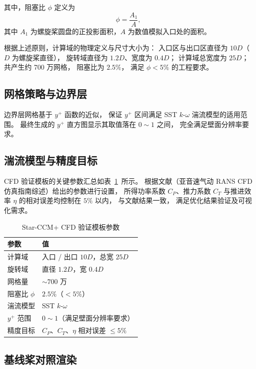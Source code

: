 其中，阻塞比 $\phi$ 定义为
\begin{equation}
\phi = \frac{A_1}{A},
\end{equation}
其中 $A_1$ 为螺旋桨圆盘的正投影面积，$A$ 为数值模拟入口处的面积。

根据上述原则，计算域的物理定义与尺寸大小为：
入口区与出口区直径为 $10D$（$D$ 为螺旋桨直径），
旋转域直径为 $1.2D$、宽度为 $0.4D$；
计算域总宽度为 $25D$；
共产生约 700 万网格，
阻塞比为 $2.5\%$，
满足 $\phi < 5\%$ 的工程要求。

\subsection{网格策略与边界层}

边界层网格基于 $y^+$ 函数的近似，
保证 $y^+$ 区间满足 SST $k$-$\omega$ 湍流模型的适用范围。
最终生成的 $y^+$ 直方图显示其取值落在 $0 \sim 1$ 之间，
完全满足壁面分辨率要求。

\subsection{湍流模型与精度目标}

CFD 验证模板的关键参数汇总如表~\ref{tab:cfd_template}~所示。
根据文献\cite{Goetten2019}（亚音速气动 RANS CFD 仿真指南综述）给出的参数进行设置，
所得功率系数 $C_P$、推力系数 $C_T$ 与推进效率 $\eta$ 的相对误差均控制在 $5\%$ 以内，
与文献结果一致，
满足优化结果验证及可视化需求。

\begin{table}[htbp]
\centering
\caption{Star-CCM+ CFD 验证模板参数}
\label{tab:cfd_template}
\begin{tabular}{ll}
\toprule
\textbf{参数} & \textbf{值} \\
\midrule
计算域 & 入口 / 出口 $10D$，总宽 $25D$ \\
旋转域 & 直径 $1.2D$，宽 $0.4D$ \\
网格量 & $\sim 700$ 万 \\
阻塞比 $\phi$ & $2.5\%$（$< 5\%$） \\
湍流模型 & SST $k$-$\omega$ \\
$y^+$ 范围 & $0 \sim 1$（满足壁面分辨率要求） \\
精度目标 & $C_P$、$C_T$、$\eta$ 相对误差 $\leq 5\%$ \\
\bottomrule
\end{tabular}
\end{table}

\subsection{基线桨对照渲染}

